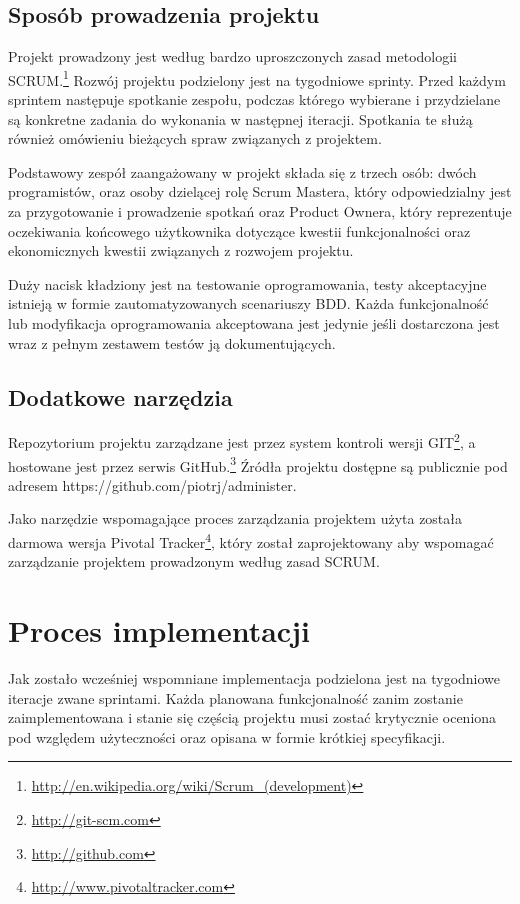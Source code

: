   \subsection{Sposób prowadzenia projektu}
  Projekt prowadzony jest według bardzo uproszczonych zasad metodologii SCRUM.\footnote{\url{http://en.wikipedia.org/wiki/Scrum_(development)}} \nocite{wiki_scrum} Rozwój projektu podzielony jest na tygodniowe sprinty. Przed każdym sprintem następuje spotkanie zespołu, podczas którego wybierane i przydzielane są konkretne zadania do wykonania w następnej iteracji. Spotkania te służą również omówieniu bieżących spraw związanych z projektem.
  
  Podstawowy zespół zaangażowany w projekt składa się z trzech osób: dwóch programistów, oraz osoby dzielącej rolę Scrum Mastera, który odpowiedzialny jest za przygotowanie i prowadzenie spotkań oraz Product Ownera, który reprezentuje oczekiwania końcowego użytkownika dotyczące kwestii funkcjonalności oraz ekonomicznych kwestii związanych z rozwojem projektu.
  
  Duży nacisk kładziony jest na testowanie oprogramowania, testy akceptacyjne istnieją w formie zautomatyzowanych scenariuszy BDD. Każda funkcjonalność lub modyfikacja oprogramowania akceptowana jest jedynie jeśli dostarczona jest wraz z pełnym zestawem testów ją dokumentujących.
  
  \subsection{Dodatkowe narzędzia}
  Repozytorium projektu zarządzane jest przez system kontroli wersji GIT\footnote{\url{http://git-scm.com}}, a hostowane jest przez serwis GitHub.\footnote{\url{http://github.com}} Źródła projektu dostępne są publicznie pod adresem https://github.com/piotrj/administer.
  
  Jako narzędzie wspomagające proces zarządzania projektem użyta została darmowa wersja Pivotal Tracker\footnote{\url{http://www.pivotaltracker.com}}, który został zaprojektowany aby wspomagać zarządzanie projektem prowadzonym według zasad SCRUM.
  
  \section{Proces implementacji}
  
  Jak zostało wcześniej wspomniane implementacja podzielona jest na tygodniowe iteracje zwane sprintami. Każda planowana funkcjonalność zanim zostanie zaimplementowana i stanie się częścią projektu musi zostać krytycznie oceniona pod względem użyteczności oraz opisana w formie krótkiej specyfikacji.
  
